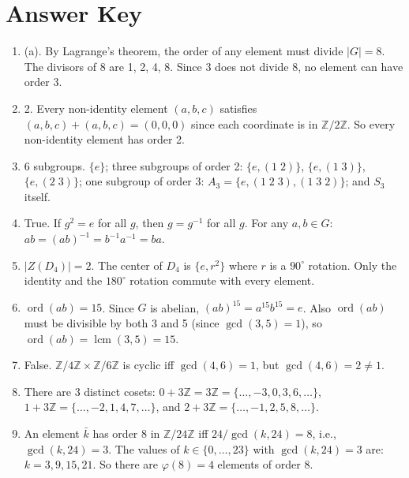 \documentclass[11pt]{article}
\begin{document}
\newpage
\section*{Answer Key}

\begin{enumerate}

\item (a). By Lagrange's theorem, the order of any element must divide $|G|=8$. The divisors of 8 are 1, 2, 4, 8. Since 3 does not divide 8, no element can have order 3.

\item 2. Every non-identity element $(a,b,c)$ satisfies $(a,b,c)+(a,b,c)=(0,0,0)$ since each coordinate is in $\mathbb{Z}/2\mathbb{Z}$. So every non-identity element has order 2.

\item 6 subgroups. $\{e\}$; three subgroups of order 2: $\{e,(1\;2)\}$, $\{e,(1\;3)\}$, $\{e,(2\;3)\}$; one subgroup of order 3: $A_3=\{e,(1\;2\;3),(1\;3\;2)\}$; and $S_3$ itself.

\item True. If $g^2=e$ for all $g$, then $g=g^{-1}$ for all $g$. For any $a,b\in G$: $ab=(ab)^{-1}=b^{-1}a^{-1}=ba$.

\item $|Z(D_4)|=2$. The center of $D_4$ is $\{e, r^2\}$ where $r$ is a $90^\circ$ rotation. Only the identity and the $180^\circ$ rotation commute with every element.

\item $\operatorname{ord}(ab)=15$. Since $G$ is abelian, $(ab)^{15}=a^{15}b^{15}=e$. Also $\operatorname{ord}(ab)$ must be divisible by both 3 and 5 (since $\gcd(3,5)=1$), so $\operatorname{ord}(ab)=\operatorname{lcm}(3,5)=15$.

\item False. $\mathbb{Z}/4\mathbb{Z}\times\mathbb{Z}/6\mathbb{Z}$ is cyclic iff $\gcd(4,6)=1$, but $\gcd(4,6)=2\neq 1$.

\item There are 3 distinct cosets: $0+3\mathbb{Z}=3\mathbb{Z}=\{\ldots,-3,0,3,6,\ldots\}$, $1+3\mathbb{Z}=\{\ldots,-2,1,4,7,\ldots\}$, and $2+3\mathbb{Z}=\{\ldots,-1,2,5,8,\ldots\}$.

\item An element $\bar{k}$ has order 8 in $\mathbb{Z}/24\mathbb{Z}$ iff $24/\gcd(k,24)=8$, i.e., $\gcd(k,24)=3$. The values of $k\in\{0,\ldots,23\}$ with $\gcd(k,24)=3$ are: $k=3,9,15,21$. So there are $\varphi(8)=4$ elements of order 8.


\end{enumerate}
\end{document}
